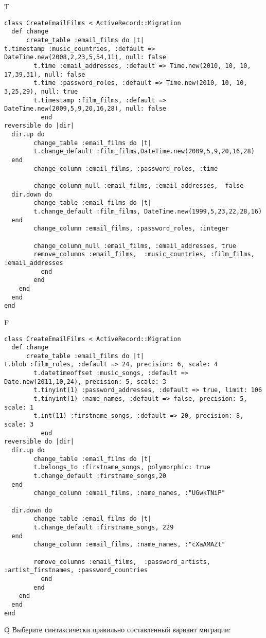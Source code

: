 T
\begin{verbatim}
class CreateEmailFilms < ActiveRecord::Migration
  def change
	  create_table :email_films do |t|
t.timestamp :music_countries, :default => DateTime.new(2008,2,23,5,54,11), null: false
		t.time :email_addresses, :default => Time.new(2010, 10, 10, 17,39,31), null: false
		t.time :password_roles, :default => Time.new(2010, 10, 10, 3,25,29), null: true
		t.timestamp :film_films, :default => DateTime.new(2009,5,9,20,16,28), null: false
		  end
reversible do |dir|
  dir.up do
		change_table :email_films do |t|
		t.change_default :film_films,DateTime.new(2009,5,9,20,16,28)
  end
 		change_column :email_films, :password_roles, :time
   
		change_column_null :email_films, :email_addresses,  false
  dir.down do
		change_table :email_films do |t|
		t.change_default :film_films, DateTime.new(1999,5,23,22,28,16)
  end
 		change_column :email_films, :password_roles, :integer
   
		change_column_null :email_films, :email_addresses, true
 		remove_columns :email_films,  :music_countries, :film_films, :email_addresses 
	      end
	    end
    end 
  end
end

\end{verbatim}

F
\begin{verbatim}
class CreateEmailFilms < ActiveRecord::Migration
  def change
	  create_table :email_films do |t|
t.blob :film_roles, :default => 24, precision: 6, scale: 4
		t.datetimeoffset :music_songs, :default => Date.new(2011,10,24), precision: 5, scale: 3
		t.tinyint(1) :password_addresses, :default => true, limit: 106
		t.tinyint(1) :name_names, :default => false, precision: 5, scale: 1
		t.int(11) :firstname_songs, :default => 20, precision: 8, scale: 3
		  end
reversible do |dir|
  dir.up do
		change_table :email_films do |t|
		t.belongs_to :firstname_songs, polymorphic: true
 		t.change_default :firstname_songs,20
  end
 		change_column :email_films, :name_names, :"UGwkTNiP"
   
  dir.down do
		change_table :email_films do |t|
		t.change_default :firstname_songs, 229
  end
 		change_column :email_films, :name_names, :"cXaAMAZt"
   
		remove_columns :email_films,  :password_artists, :artist_firstnames, :password_countries 
	      end
	    end
    end 
  end
end

\end{verbatim}

Q
Выберите синтаксически правильно составленный вариант миграции:

